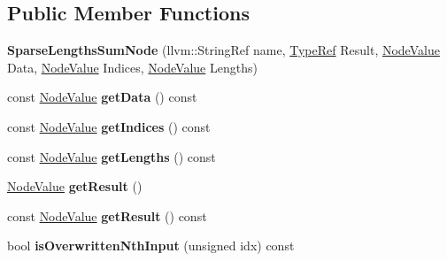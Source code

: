 \subsection*{Public Member Functions}
\begin{DoxyCompactItemize}
\item 
\mbox{\label{classglow_1_1_sparse_lengths_sum_node_a0c8ebd370b62917f6cfce8ce217e456a}} 
{\bfseries Sparse\+Lengths\+Sum\+Node} (llvm\+::\+String\+Ref name, \hyperlink{structglow_1_1_type}{Type\+Ref} Result, \hyperlink{structglow_1_1_node_value}{Node\+Value} Data, \hyperlink{structglow_1_1_node_value}{Node\+Value} Indices, \hyperlink{structglow_1_1_node_value}{Node\+Value} Lengths)
\item 
\mbox{\label{classglow_1_1_sparse_lengths_sum_node_ae1fa727fbda014383abc425a546eeb1a}} 
const \hyperlink{structglow_1_1_node_value}{Node\+Value} {\bfseries get\+Data} () const
\item 
\mbox{\label{classglow_1_1_sparse_lengths_sum_node_a8495d98c265204fa34ce7e19be95e739}} 
const \hyperlink{structglow_1_1_node_value}{Node\+Value} {\bfseries get\+Indices} () const
\item 
\mbox{\label{classglow_1_1_sparse_lengths_sum_node_a7067aabcd62c89cbc18fc326bebf6940}} 
const \hyperlink{structglow_1_1_node_value}{Node\+Value} {\bfseries get\+Lengths} () const
\item 
\mbox{\label{classglow_1_1_sparse_lengths_sum_node_af44ffdaeac5b9a3419265048efaaf607}} 
\hyperlink{structglow_1_1_node_value}{Node\+Value} {\bfseries get\+Result} ()
\item 
\mbox{\label{classglow_1_1_sparse_lengths_sum_node_a61d9c5e099b215bb474273e27875d439}} 
const \hyperlink{structglow_1_1_node_value}{Node\+Value} {\bfseries get\+Result} () const
\item 
\mbox{\label{classglow_1_1_sparse_lengths_sum_node_a43dbd7175612b5f5e4887fd5a45f1ded}} 
bool {\bfseries is\+Overwritten\+Nth\+Input} (unsigned idx) const

\end{DoxyCompactItemize}
